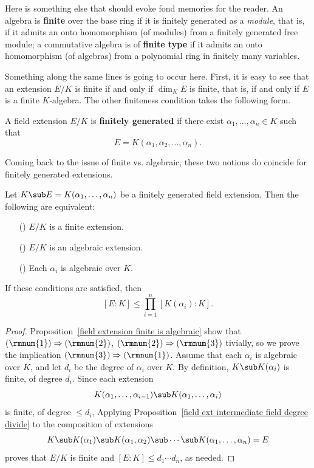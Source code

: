 Here is something else that should evoke fond memories for the reader. An algebra is \textbf{finite} over the base ring if it is finitely generated as a \textit{module}, that is, if it admits an onto homomorphism (of modules) from a finitely generated free module; a commutative algebra is of \textbf{finite type} if it admits an onto homomorphism (of algebras) from a polynomial ring in finitely many variables.\par
Something along the same lines is going to occur here. First, it is easy to see that an extension $E/K$ is finite if and only if $\dim_KE$ is finite, that is, if and only if $E$ is a finite $K$-algebra. The other finiteness condition takes the following form.
\begin{definition}
A field extension $E/K$ is \textbf{finitely generated} if there exist $\alpha_1,\dots,\alpha_n\in K$ such that
\[E=K(\alpha_1,\alpha_2,\dots,\alpha_n).\]
\end{definition}
Coming back to the issue of finite vs. algebraic, these two notions do coincide for finitely generated extensions.
\begin{proposition}\label{field ext finitely generated finite iff}
Let $K\sub E=K(\alpha_1,\dots,\alpha_n)$ be a finitely generated field extension. Then the following are equivalent:
\begin{itemize}
\item[(\rmnum{1})] $E/K$ is a finite extension.
\item[(\rmnum{2})] $E/K$ is an algebraic extension.
\item[(\rmnum{3})] Each $\alpha_i$ is algebraic over $K$.
\end{itemize}
If these conditions are satisfied, then 
\[[E:K]\leq\prod_{i=1}^{n}[K(\alpha_i):K].\]
\end{proposition}
\begin{proof}
Proposition~\ref{field extension finite is algebraic} show that $(\rmnum{1})\Rightarrow(\rmnum{2})$, $(\rmnum{2})\Rightarrow(\rmnum{3})$ tivially, so we prove the implication $(\rmnum{3})\Rightarrow(\rmnum{1})$. Assume that each $\alpha_i$ is algebraic over $K$, and let $d_i$ be the degree of $\alpha_i$ over $K$. By definition, $K\sub K(\alpha_i)$ is finite, of degree $d_i$. Since each extension
\[K(\alpha_1,\dots,\alpha_{i-1})\sub K(\alpha_1,\dots,\alpha_i)\]
is finite, of degree $\leq d_i$, Applying Proposition~\ref{field ext intermediate field degree divide} to the composition of extensions
\[K\sub K(\alpha_1)\sub K(\alpha_1,\alpha_2)\sub\cdots\sub K(\alpha_1,\dots,\alpha_n)=E\]
proves that $E/K$ is finite and $[E:K]\leq d_1\cdots d_n$, as needed.
\end{proof}
